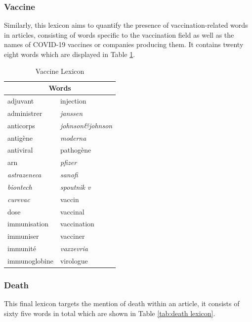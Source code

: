 \subsubsection{Vaccine}

Similarly, this lexicon aims to quantify the presence of vaccination-related words in articles, consisting of words specific to the vaccination field as well as the names of COVID-19 vaccines or companies producing them. It contains  twenty eight words which are displayed in Table \ref{tab:vaccine lexicon}.

\begin{table}[H]
\centering
\begin{tabular}{@{}ll@{}}
\toprule
\multicolumn{2}{c}{\textbf{Words}} \\ \midrule
adjuvant & injection \\
administrer & \textit{janssen} \\
anticorps & \textit{johnson\&johnson} \\
antigène & \textit{moderna} \\
antiviral & pathogène \\
arn & \textit{pfizer} \\
\textit{astrazeneca} & \textit{sanofi} \\
\textit{biontech} & \textit{spoutnik v} \\
\textit{curevac} & vaccin \\
dose & vaccinal \\
immunisation & vaccination \\
immuniser & vacciner \\
immunité & \textit{vaxzevria} \\
immunoglobine & virologue \\
\bottomrule
\end{tabular}
\caption{Vaccine Lexicon}
\label{tab:vaccine lexicon}
\end{table}

\subsubsection{Death}

This final lexicon targets the mention of death within an article, it consists of sixty five words in total which are shown in Table \ref{tab:death lexicon}.

